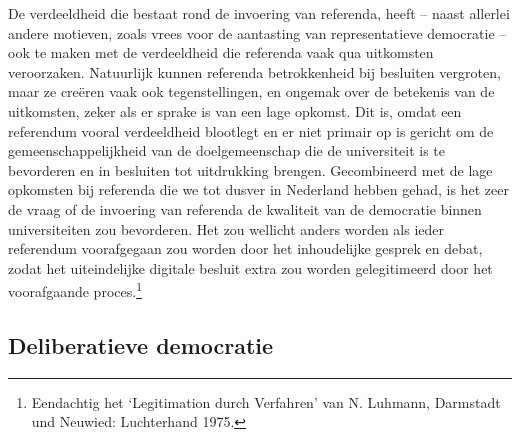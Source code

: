 \documentclass[smallauthor, chapterhaspagenum, nochapterinheader, pagenuminheader,  bigchapnum,medium2, tocpages,  garamond, titleinheader]{jote-book}
\begin{document}
	De verdeeldheid die bestaat rond de invoering van referenda, heeft -- naast allerlei andere motieven, zoals vrees voor de aantasting van representatieve democratie -- ook te maken met de verdeeldheid die referenda vaak qua uitkomsten veroorzaken. Natuurlijk kunnen referenda betrokkenheid bij besluiten vergroten, maar ze creëren vaak ook tegenstellingen, en ongemak over de betekenis van de uitkomsten, zeker als er sprake is van een lage opkomst. Dit is, omdat een referendum vooral verdeeldheid blootlegt en er niet primair op is gericht om de gemeenschappelijkheid van de doelgemeenschap die de universiteit is te bevorderen en in besluiten tot uitdrukking brengen. Gecombineerd met de lage opkomsten bij referenda die we tot dusver in Nederland hebben gehad, is het zeer de vraag of de invoering van referenda de kwaliteit van de democratie binnen universiteiten zou bevorderen. Het zou wellicht anders worden als ieder referendum voorafgegaan zou worden door het inhoudelijke gesprek en debat, zodat het uiteindelijke digitale besluit extra zou worden gelegitimeerd door het voorafgaande proces.\footnote{Eendachtig het ‘Legitimation durch Verfahren' van N. Luhmann, Darmstadt und Neuwied: Luchterhand 1975.}



	\subsection{Deliberatieve democratie}
\end{document}

